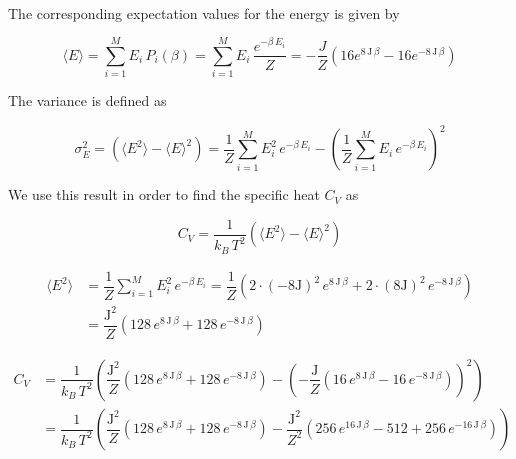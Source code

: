 \documentclass[a4paper, fontsize=11pt]{article}
\begin{document}
\paragraph{}
The corresponding expectation values for the energy is given by

\begin{equation}
\langle E \rangle = \sum^M_{i=1} E_{i} \, P_{i}(\beta) = \sum^M_{i=1} E_{i} \, \dfrac{e^{-\beta \, E_{i}}}{Z} = -\dfrac{J}{Z} \left(16 e^{8 \, \text{J} \, \beta} - 16 e^{-8 \, \text{J} \, \beta} \right)
\end{equation}

The variance is defined as

\begin{equation}
\sigma^2_{E} = \left( \langle E^2 \rangle - \langle E \rangle^2 \right) = \dfrac{1}{Z} \sum^M_{i=1} E_{i}^2 \, e^{-\beta \, E_{i}} - \left( \dfrac{1}{Z} \sum^M_{i=1} E_{i} \, e^{-\beta \, E_{i}} \right)^2
\end{equation}

We use this result in order to find the specific heat  $C_{V}$ as

\begin{equation}
C_{V} = \dfrac{1}{k_{B} \, T^2} \left( \langle E^2 \rangle - \langle E \rangle^2 \right)
\end{equation}

\begin{align}
\langle E^2 \rangle &= \dfrac{1}{Z} \sum^M_{i=1} E_{i}^2 \, e^{-\beta \, E_{i}} = \dfrac{1}{Z} \left( 2 \cdot \left( -8 \text{J} \right)^2 \, e^{8 \, \text{J} \, \beta} + 2 \cdot \left( 8 \text{J} \right)^2 \, e^{-8 \, \text{J} \, \beta} \right)
\\
&= \dfrac{\text{J}^2}{Z} \left( 128 \, e^{8 \, \text{J} \, \beta} + 128 \, e^{-8 \, \text{J} \, \beta} \right)
\end{align}


\begin{align}
C_{V} &= \dfrac{1}{k_{B} \, T^2} \left( \dfrac{\text{J}^2}{Z} \left( 128 \, e^{8 \, \text{J} \, \beta} + 128 \, e^{-8 \, \text{J} \, \beta} \right) - \left(-\dfrac{\text{J}}{Z} \left(16 \, e^{8 \, \text{J} \, \beta} - 16 \, e^{-8 \, \text{J} \, \beta} \right) \right)^2 \right)
\\
&= 
\dfrac{1}{k_{B} \, T^2} \left( \dfrac{\text{J}^2}{Z} \left( 128 \, e^{8 \, \text{J} \, \beta} + 128 \, e^{-8 \, \text{J} \, \beta} \right) 
- 
\dfrac{\text{J}^2}{Z^2} \left(256 \, e^{16 \, \text{J} \, \beta} - 512 + 256 \, e^{-16 \, \text{J} \, \beta} \right) \right) 
\end{align}
\end{document}
